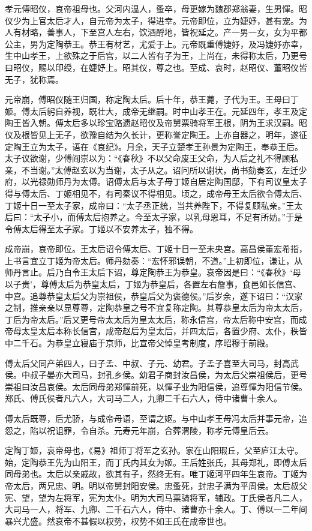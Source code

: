\documentclass[]{article}
\begin{document}
孝元傅昭仪，哀帝祖母也。父河内温人，蚤卒，母更嫁为魏郡郑翁妻，生男惲。昭仪少为上官太后才人，自元帝为太子，得进幸。元帝即位，立为婕妤，甚有宠。为人有材略，善事人，下至宫人左右，饮酒酹地，皆祝延之。产一男一女，女为平都公主，男为定陶恭王。恭王有材艺，尤爱于上。元帝既重傅婕妤，及冯婕妤亦幸，生中山孝王，上欲殊之于后宫，以二人皆有子为王，上尚在，未得称太后，乃更号曰昭仪，赐以印绶，在婕妤上。昭其仪，尊之也。至成、哀时，赵昭仪、董昭仪皆无子，犹称焉。

元帝崩，傅昭仪随王归国，称定陶太后。后十年，恭王薨，子代为王。王母曰丁姬。傅太后躬自养视，既壮大，成帝无继嗣。时中山孝王在。元延四年，孝王及定陶王皆入朝。傅太后多以珍宝赂遗赵昭仪及帝舅票骑将军王根，阴为王求汉嗣。昭仪及根皆见上无子，欲豫自结为久长计，更称誉定陶王。上亦自器之，明年，遂征定陶王立为太子，语在《哀纪》。月余，天子立楚孝王孙景为定陶王，奉恭王后。太子议欲谢，少傅阎崇以为：``《春秋》不以父命废王父命，为人后之礼不得顾私亲，不当谢。''太傅赵玄以为当谢，太子从之。诏问所以谢状，尚书劾奏玄，左迁少府，以光禄勋师丹为太傅。诏傅太后与太子母丁姬自居定陶国邸，下有司议皇太子得与傅太后、丁姬相见不，有司秦议不得相见。顷之，成帝母王太后欲令傅太后、丁姬十日一至太子家，成帝曰：``太子丞正统，当共养陛下，不得复顾私亲。''王太后曰：``太子小，而傅太后抱养之。今至太子家，以乳母恩耳，不足有所妨。''于是令傅太后得至太子家。丁姬以不安养太子，独不得。

成帝崩，哀帝即位。王太后诏令傅太后、丁姬十日一至未央宫。高昌侯董宏希指，上书言宜立丁姬为帝太后。师丹劾奏：``宏怀邪误朝，不道。''上初即位，谦让，从师丹言止。后乃白令王太后下诏，尊定陶恭王为恭皇。哀帝因是曰：``《春秋》`母以子贵'，尊傅太后为恭皇太后，丁姬为恭皇后，各置左右詹事，食邑如长信宫、中宫。追尊恭皇太后父为崇祖侯，恭皇后父为褒德侯。''后岁余，遂下诏曰：``汉家之制，推亲亲以显尊尊，定陶恭皇之号不宜复称定陶。其尊恭皇太后为帝太太后，丁后为帝太后。''后又更号帝太太后为皇太太后，称永信宫，帝太后称中安宫，而成帝母太皇太后本称长信宫，成帝赵后为皇太后，并四太后，各置少府、太仆，秩皆中二千石。为恭皇立寝庙于京师，比宣帝父悼皇考制度，序昭穆于前殿。

傅太后父同产弟四人，曰子孟、中叔、子元、幼君。子孟子喜至大司马，封高武侯。中叔子晏亦大司马，封孔乡侯。幼君子商封汝昌侯，为太后父崇祖侯后，更号崇祖曰汝昌哀侯。太后同母弟郑惲前死，以惲子业为阳信侯，追尊惲为阳信节侯。郑氏、傅氏侯者凡六人，大司马二人，九卿二千石六人，侍中诸曹十余人。

傅太后既尊，后尤骄，与成帝母语，至谓之妪。与中山孝王母冯太后并事元帝，追怨之，陷以祝诅罪，令自杀。元寿元年崩，合葬渭陵，称孝元傅皇后云。

定陶丁姬，哀帝母也，《易》祖师丁将军之玄孙。家在山阳瑕丘，父至庐江太守。始，定陶恭王先为山阳王，而丁氏内其女为姬。王后姓张氏，其母郑礼，即傅太后同母弟也。太后以亲戚故，欲其有子，然终无有。唯丁姬河平四年生哀帝。丁姬为帝太后，两兄忠、明。明以帝舅封阳安侯。忠蚤死，封忠子满为平周侯。太后叔父宪、望，望为左将军，宪为太仆。明为大司马票骑将军，辅政。丁氏侯者凡二人，大司马一人，将军、九卿、二千石六人，侍中、诸曹亦十余人。丁、傅以一二年间暴兴尤盛。然哀帝不甚假以权势，权势不如王氏在成帝世也。
\end{document}
